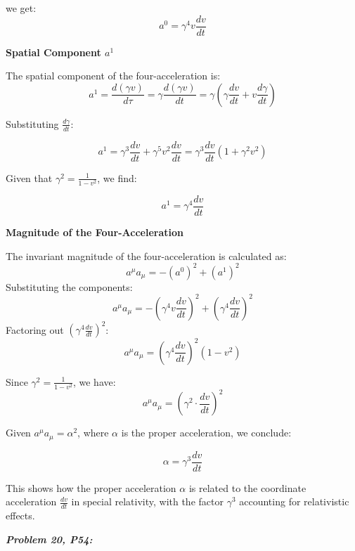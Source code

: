 \documentclass[12pt]{book}
\begin{document}
            we get:
            \[
            a^0 = \gamma^4 v \frac{dv}{dt}
            \]
            
            \textbf{Spatial Component \( a^1 \)}
            
            The spatial component of the four-acceleration is:
            \[
            a^1 = \frac{d(\gamma v)}{d\tau} = \gamma \frac{d(\gamma v)}{dt} = \gamma \left( \gamma \frac{dv}{dt} + v \frac{d\gamma}{dt} \right)
            \]
            
            Substituting \( \frac{d\gamma}{dt} \):
            
            \[
            a^1 = \gamma^3 \frac{dv}{dt} + \gamma^5 v^2 \frac{dv}{dt} = \gamma^3 \frac{dv}{dt} \left(1 + \gamma^2 v^2\right)
            \]
            
            Given that \( \gamma^2 = \frac{1}{1 - v^2} \), we find:
            
            \[
            a^1 = \gamma^4 \frac{dv}{dt}
            \]
            
            \textbf{Magnitude of the Four-Acceleration}
            
            The invariant magnitude of the four-acceleration is calculated as:
            \[
            a^\mu a_\mu = -(a^0)^2 + (a^1)^2
            \]
            Substituting the components:
            \[
            a^\mu a_\mu = -\left(\gamma^4 v \frac{dv}{dt}\right)^2 + \left(\gamma^4 \frac{dv}{dt}\right)^2
            \]
            Factoring out \( \left(\gamma^4 \frac{dv}{dt}\right)^2 \):
            \[
            a^\mu a_\mu = \left(\gamma^4 \frac{dv}{dt}\right)^2 \left(1 - v^2\right)
            \]
            
            Since \( \gamma^2 = \frac{1}{1 - v^2} \), we have:
            \[
            a^\mu a_\mu = \left(\gamma^2 \cdot \frac{dv}{dt}\right)^2
            \]
            
            Given \( a^\mu a_\mu = \alpha^2 \), where \( \alpha \) is the proper acceleration, we conclude:
            
            \[
            \alpha = \gamma^3 \frac{dv}{dt}
            \]
            
            This shows how the proper acceleration \( \alpha \) is related to the coordinate acceleration \( \frac{dv}{dt} \) in special relativity, with the factor \( \gamma^3 \) accounting for relativistic effects.

        \textbf{\textit{Problem 20, P54:}}
        
\end{document}
